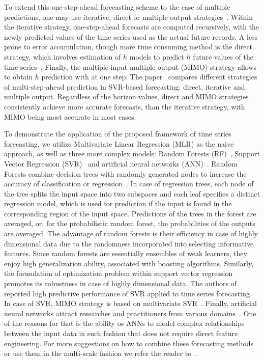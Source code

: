 \documentclass[conference]{IEEEtran}
\begin{document}
 To extend this one-step-ahead forecasting scheme to the case of multiple predictions, one may use iterative, direct or multiple output strategies~\cite{Bao2014}. Within the iterative strategy, one-step-ahead forecasts are computed recursively, with the newly predicted values of the time series used as the actual future records. A less prone to error accumulation, though more time consuming method is the direct strategy, which involves estimation of $h$ models to predict $h$ future values of the time series~\cite{Zhang2013}. Finally, the multiple input multiple output (MIMO) strategy allows to obtain $h$ prediction with at one step.  The paper~\cite{Bao2014} compares different strategies of multi-step-ahead prediction in SVR-based forecasting: direct, iterative and multiple output. Regardless of the horizon values, direct and MIMO strategies consistently achieve more accurate forecasts, than the iterative strategy, with MIMO being most accurate in most cases.


To demonstrate the application of the proposed framework of time series forecasting, we utilize Multivariate Linear Regression (MLR) as the naive approach, as well as three more complex models: Random Forests (RF)~\cite{Yu2016, Kane2014}, Support Vector Regression (SVR)~\cite{Trafalis2000, Navarrete2015, Hao2006} and artificial neural networks (ANN)~\cite{Busseti2012, Taylor2009}.  Random Forests combine decision trees with randomly generated nodes to increase the accuracy of classification or regression~\cite{Criminisi2011}. In case of regression trees, each node of the tree splits the input space into two subspaces and each leaf specifies a distinct regression model, which is used for prediction if the input is found in the corresponding region of the input space. Predictions of the trees in the forest are averaged, or, for the probabilistic random forest, the probabilities of the outputs are averaged. The advantage of random forests is their efficiency in case of highly dimensional data due to the randomness incorporated into selecting informative features. Since random forests are essentially ensembles of weak learners, they enjoy high generalization ability, associated with boosting algorithms.
 Similarly, the formulation of optimization problem within support vector regression promotes its robustness in case of highly dimensional data. The authors of~\cite{Trafalis2000, Hao2006} reported high predictive performance of SVR applied to time series forecasting. In case of SVR, MIMO strategy is based on multivariate SVR~\cite{PerezCruz2002}. Finally, artificial neural networks attract researches and practitioners from various domains~\cite{Taylor2009, Qiu2014}. One of the reasons for that is the ability os ANNs to model complex relationships between the input data in such fashion that does not require direct feature engineering. For more suggestions on how to combine these forecasting methods~\cite{Qiu2014, Grover2015} or use them in the multi-scale fashion we refer the reader to~\cite{Chen2004, Zhu2012, Cui2016, Bai2015, Ferrari2012}.
\end{document}

